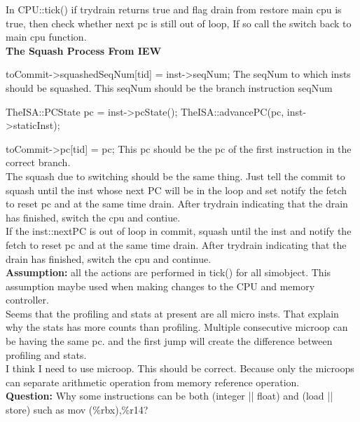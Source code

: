 \documentclass[11pt]{article}
\begin{document}
In CPU::tick() if trydrain returns true and flag drain from restore main cpu is true, then check whether next pc is still out of loop, If so call the switch back to main cpu function.\\

\textbf{The Squash Process From IEW\\}

toCommit-\textgreater squashedSeqNum[tid] = inst-\textgreater seqNum; The seqNum to which insts should be squashed. This seqNum should be the branch instruction seqNum

TheISA::PCState pc = inst-\textgreater pcState();
TheISA::advancePC(pc, inst-\textgreater staticInst);

toCommit-\textgreater pc[tid] = pc; This pc should be the pc of the first instruction in the correct branch.\\

The squash due to switching should be the same thing. Just tell the commit to squash until the inst whose next PC will be in the loop and set notify the fetch to reset pc and at the same time drain. After trydrain indicating that the drain has finished, switch the cpu and contiue. \\

If the inst::nextPC is out of loop in commit, squash until the inst and notify the fetch to reset pc and at the same time drain. After trydrain indicating that the drain has finished, switch the cpu and continue.\\

\textbf{Assumption:} all the actions are performed in tick() for all simobject. This assumption maybe used when making changes to the CPU and memory controller.\\

Seems that the profiling and stats at present are all micro insts. That explain why the stats has more counts than profiling. Multiple consecutive microop can be having the same pc. and the first jump will create the difference between profiling and stats.\\

I think I need to use microop. This should be correct. Because only the microops can separate arithmetic operation from memory reference operation.\\

\textbf{Question: } Why some instructions can be both (integer || float) and (load || store) such as mov    (\%rbx),\%r14?\\
\end{document}
